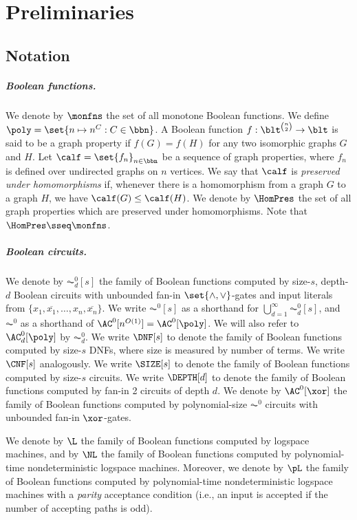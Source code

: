 \documentclass[11pt]{article}
\begin{document}
\section{Preliminaries}

\subsection{Notation}

\subparagraph{Boolean functions.}

We denote by $\monfns$ the set of all monotone Boolean functions.
We define $\poly = \set{n \mapsto n^C : C \in \bbn}$.
A Boolean function
    $f : \blt^{\binom{n}{2}} \to \blt$ is said to be a graph property
    if $f(G) = f(H)$ for any two isomorphic graphs $G$ and $H$.
Let $\calf = \set{f_n}_{n \in \bbn}$
    be a sequence of graph properties, where $f_n$ is defined over undirected graphs on
    $n$ vertices.
    We say that $\calf$ is
    \emph{preserved under homomorphisms} if,
    whenever there is a homomorphism from a graph $G$ to a graph $H$,
    we have $\calf(G) \leq \calf(H)$.
    We denote by $\HomPres$ 
    the set of all 
    graph properties which are preserved under homomorphisms.
    Note that $\HomPres \sseq \monfns$.

    \subparagraph{Boolean circuits.}

    We denote by $\AC^0_d[s]$ 
    the family of Boolean functions computed by
    size-$s$,
    depth-$d$
    Boolean circuits with unbounded fan-in $\set{\land,\lor}$-gates and input literals from $\{x_1, \overline{x_1}, \ldots, x_n, \overline{x_n}\}$.
    We write $\AC^0[s]$ as a shorthand for
    $\bigcup_{d = 1}^\infty \AC^0_d[s]$,
    and $\AC^0$ as a shorthand of $\AC^0[n^{O(1)}] = \AC^0[\poly]$.
    We will also refer to $\AC^0_d[\poly]$
    by $\AC^0_d$.
We write $\DNF[s]$ to denote the family of Boolean functions
    computed by size-$s$ DNFs, where size is measured by  number of terms.
    We write $\CNF[s]$ analogously.
    We write $\SIZE[s]$ to denote
    the family of Boolean functions
    computed by size-$s$ circuits.
    We write $\DEPTH[d]$ to denote
    the family of Boolean functions
    computed by fan-in 2 circuits of depth $d$.
We denote by $\AC^0[\xor]$ the family of Boolean functions computed by
polynomial-size $\AC^0$ circuits with unbounded fan-in $\xor$-gates.

We denote by $\L$ the 
family of
Boolean functions
computed by  logspace machines,
and by $\NL$ the family of Boolean functions
computed by polynomial-time nondeterministic logspace machines.
Moreover, we denote by $\pL$
the family of Boolean functions computed by
polynomial-time nondeterministic logspace machines with a \emph{parity}
acceptance condition (i.e.,
an input is accepted if the number of accepting paths is odd).
\end{document}
